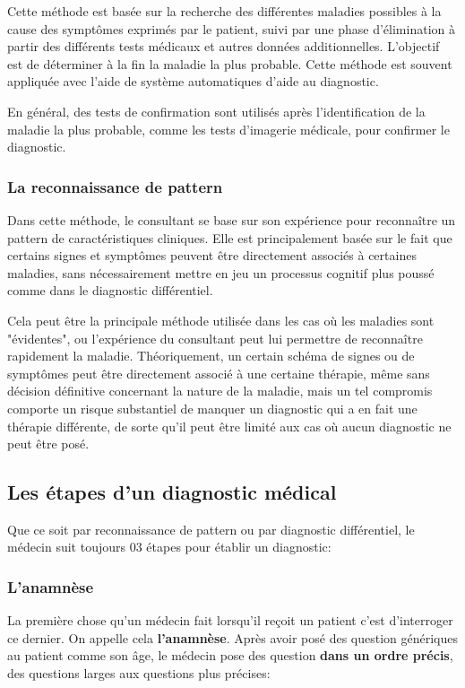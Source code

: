 Cette méthode est basée sur la recherche des différentes maladies possibles à la cause des symptômes exprimés par le patient, suivi par une phase d'élimination à partir des différents tests médicaux et autres données additionnelles. L'objectif est de déterminer à la fin la maladie la plus probable. Cette méthode est souvent appliquée avec l'aide de système automatiques d'aide au diagnostic.

En général, des tests de confirmation sont utilisés après l'identification de la maladie la plus probable, comme les tests d'imagerie médicale, pour confirmer le diagnostic.

\subsubsection{La reconnaissance de pattern}

Dans cette méthode, le consultant se base sur son expérience pour reconnaître un pattern de caractéristiques cliniques. Elle est principalement basée sur le fait que certains signes et symptômes peuvent être directement associés à certaines maladies, sans nécessairement mettre en jeu un processus cognitif plus poussé comme dans le diagnostic différentiel.

Cela peut être la principale méthode utilisée dans les cas où les maladies sont "évidentes", ou l'expérience du consultant peut lui permettre de reconnaître rapidement la maladie. Théoriquement, un certain schéma de signes ou de symptômes peut être directement associé à une certaine thérapie, même sans décision définitive concernant la nature de la maladie, mais un tel compromis comporte un risque substantiel de manquer un diagnostic qui a en fait une thérapie différente, de sorte qu'il peut être limité aux cas où aucun diagnostic ne peut être posé.


\subsection{Les étapes d'un diagnostic médical}

Que ce soit par reconnaissance de pattern ou par diagnostic différentiel, le médecin suit toujours 03 étapes pour établir un diagnostic:

\subsubsection{L'anamnèse}
La première chose qu'un médecin fait lorsqu'il reçoit un patient c'est d'interroger ce dernier. On appelle cela \textbf{l'anamnèse}. Après avoir posé des question génériques au patient comme son âge, le médecin pose des question \textbf{dans un ordre précis}, des questions larges aux questions plus précises:

